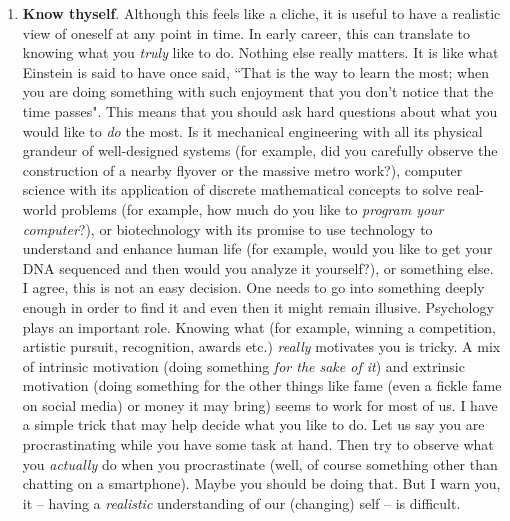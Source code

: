 \documentclass[a6paper]{article}
\begin{document}
\begin{enumerate}
    \item \textbf{Know thyself}. Although this feels like a cliche, it is useful to have a realistic view of oneself at any point in time. In early career, this can translate to knowing what you \emph{truly} like to do. Nothing else really matters. It is like what Einstein is said to have once said, ``That is the way to learn the most; when you are doing something with such enjoyment that you don't notice that the time passes". This means that you should ask hard questions about what you would like to \emph{do} the most. Is it mechanical engineering with all its physical grandeur of well-designed systems (for example, did you carefully observe the construction of a nearby flyover or the massive metro work?), computer science with its application of discrete mathematical concepts to solve real-world problems (for example, how much do you like to \emph{program your computer}?), or biotechnology with its promise to use technology to understand and enhance human life (for example, would you like to get your DNA sequenced and then would you analyze it yourself?), or something else. I agree, this is not an easy decision. One needs to go into something deeply enough in order to find it and even then it might remain illusive. Psychology plays an important role. Knowing what (for example, winning a competition, artistic pursuit, recognition, awards etc.) \emph{really} motivates you is tricky. A mix of intrinsic motivation (doing something \emph{for the sake of it}) and extrinsic motivation (doing something for the other things like fame (even a fickle fame on social media) or money it may bring) seems to work for most of us. I have a simple trick that may help decide what you like to do. Let us say you are procrastinating while you have some task at hand. Then try to observe what you \emph{actually} do when you procrastinate (well, of course something other than chatting on a smartphone). Maybe you should be doing that. But I warn you, it -- having a \emph{realistic} understanding of our (changing) self -- is difficult. 

\end{enumerate}
\end{document}
